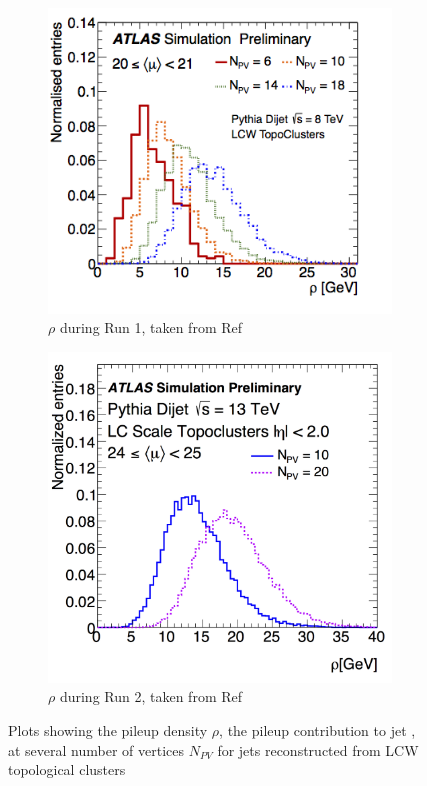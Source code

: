 \begin{figure}[h]
\begin{subfigure}{0.52\textwidth}
   \includegraphics[width=\textwidth]{figures/rho8.png}
	\caption{$\rho$ during Run 1, taken from Ref~~\cite{Malaescu:2048678}}
	\label{fig:rho8}
\end{subfigure} %
\begin{subfigure}{0.48\textwidth}
   \includegraphics[width=\textwidth]{figures/rho13.png}
	\caption{$\rho$ during Run 2, taken from Ref~\cite{Dandoy:2136864}}
	\label{fig:rho13}
\end{subfigure}
	\caption{Plots showing the pileup density $\rho$, the pileup contribution to jet \pt, 
at several number of vertices $N_{PV}$ for jets reconstructed from LCW topological clusters}
\end{figure}

